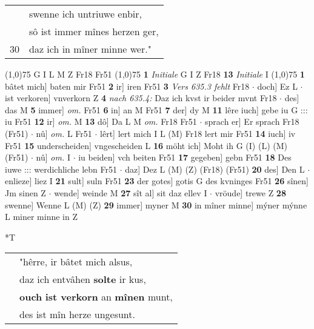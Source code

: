 \documentclass[8pt,a4paper,notitlepage]{article}
\begin{document}
\begin{table}[ht]
\begin{minipage}[t]{0.5\linewidth}
\begin{tabular}{rl}
 & swenne ich untriuwe enbir,\\ 
 & sô ist immer mînes herzen ger,\\ 
30 & daz ich in mîner minne wer."\\ 
\end{tabular}
\scriptsize
\line(1,0){75} \newline
G I L M Z Fr18 Fr51 \newline
\line(1,0){75} \newline
\textbf{1} \textit{Initiale} G I Z Fr18  \textbf{13} \textit{Initiale} I  \newline
\line(1,0){75} \newline
\textbf{1} bâtet mich] baten mir Fr51 \textbf{2} ir] iren Fr51 \textbf{3} \textit{Vers 635.3 fehlt} Fr18   $\cdot$ doch] Ez L  $\cdot$ ist verkoren] vnverkorn Z \textbf{4} \textit{nach 635.4:} Daz ich kvst ir beider mvnt Fr18   $\cdot$ des] das M \textbf{5} immer] \textit{om.} Fr51 \textbf{6} in] an M Fr51 \textbf{7} der] dy M \textbf{11} lêre iuch] gebe iu G ::: iu Fr51 \textbf{12} ir] \textit{om.} M \textbf{13} dô] Da L M \textit{om.} Fr18 Fr51  $\cdot$ sprach er] Er sprach Fr18 (Fr51)  $\cdot$ nû] \textit{om.} L Fr51  $\cdot$ lêrt] lert mich I L (M) Fr18 lert mir Fr51 \textbf{14} iuch] iv Fr51 \textbf{15} underscheiden] vngescheiden L \textbf{16} möht ich] Moht ih G (I) (L) (M) (Fr51)  $\cdot$ nû] \textit{om.} I  $\cdot$ iu beiden] vch beiten Fr51 \textbf{17} gegeben] gebn Fr51 \textbf{18} Des iuwe ::: werdichliche lebn Fr51  $\cdot$ daz] Dez L (M) (Z) (Fr18) (Fr51) \textbf{20} des] Den L  $\cdot$ enlieze] liez I \textbf{21} sult] suln Fr51 \textbf{23} der gotes] gotis G des kvninges Fr51 \textbf{26} sînen] Jm sinen Z  $\cdot$ wende] weinde M \textbf{27} sît al] sit daz ellev I  $\cdot$ vröude] trewe Z \textbf{28} swenne] Wenne L (M) (Z) \textbf{29} immer] myner M \textbf{30} in mîner minne] mýner mýnne L miner minne in Z \newline
\end{minipage}
\hspace{0.5cm}
\begin{minipage}[t]{0.5\linewidth}
\small
\begin{center}*T
\end{center}
\begin{tabular}{rl}
 & "hêrre, ir bâtet mich alsus,\\ 
 & daz ich entvâhen \textbf{solte} ir kus,\\ 
 & \textbf{ouch} \textbf{ist verkorn} an \textbf{mînen} munt,\\ 
 & des ist mîn herze ungesunt.\\ 

\end{tabular}
\end{minipage}
\end{table}
\end{document}
